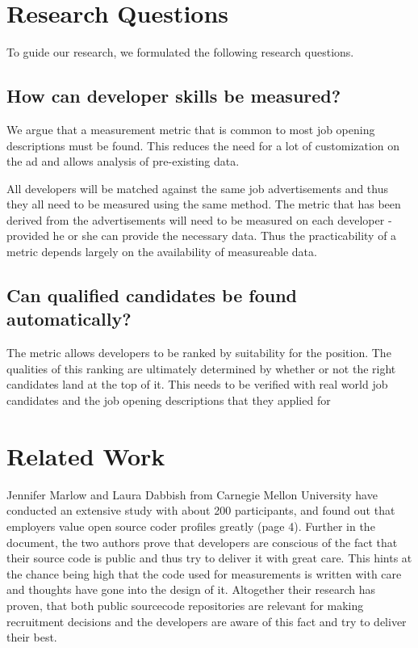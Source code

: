 \section{Research Questions} \label{sec:research-questions}

To guide our research, we formulated the following research questions.

\subsection{How can developer skills be measured?}\label{subsec:dev-skill-measurement}
We argue that a measurement metric that is common to most job opening
descriptions must be found. This reduces the need for a lot of customization
on the ad and allows analysis of pre-existing data.
\newline

All developers will be matched against the same job advertisements and thus
they all need to be measured using the same method. The metric that
has been derived from the advertisements will need to be measured
on each developer - provided he or she can provide the necessary data.
Thus the practicability of a metric depends largely on the availability
of measureable data.

\subsection{Can qualified candidates be found automatically?}\label{subsec:measurement-quality}
The metric allows developers to be ranked by suitability for the position.
The qualities of this ranking are ultimately determined by whether
or not the right candidates land at the top of it. This needs to be
verified with real world job candidates and the job opening descriptions
that they applied for


\section{Related Work}

Jennifer Marlow and Laura Dabbish\cite{md:2013} from Carnegie Mellon
University have conducted an extensive study with about
200 participants, and found out that employers value
open source coder profiles greatly (page 4). Further in the document,
the two authors prove that developers are conscious of the fact
that their source code is public and thus try to deliver it with
great care. This hints at the chance being high that the code used for measurements
is written with care and thoughts have gone into the design of it.
Altogether their research has proven, that both public sourcecode repositories
are relevant for making recruitment decisions and the developers
are aware of this fact and try to deliver their best.
\newline

